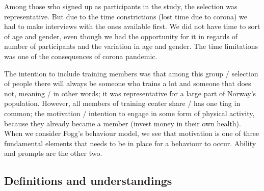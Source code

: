 Among those who signed up as participants in the study, the selection was representative. But due to the time constrictions (lost time due to corona) we had to make interviews with the ones available first. We did not have time to sort of age and gender, even though we had the opportunity for it in regards of number of participants and the variation in age and gender. The time limitations was one of the consequences of corona pandemic. 

The intention to include training members was that among this group / selection of people there will always be someone who trains a lot and someone that does not, meaning / in other words; it was representative for a large part of Norway's population. However, all members of training center share / has one ting in common; the motivation / intention to engage in some form of physical activity, because they already became a member (invest money in their own health). When we consider Fogg's behaviour model, we see that motivation is one of three fundamental elements that needs to be in place for a behaviour to occur. Ability and prompts are the other two. 

\subsection{Definitions and understandings}

